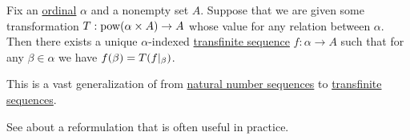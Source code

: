 \begin{theorem}\label{thm:bounded_transfinite_recursion}
  Fix an \hyperref[def:ordinal]{ordinal} \( \alpha \) and a nonempty set \( A \). Suppose that we are given some transformation \( T: \operatorname{pow}(\alpha \times A) \to A \) whose value for any relation between \( \alpha \). Then there exists a unique \( \alpha \)-indexed \hyperref[def:transfinite_sequence]{transfinite sequence} \( f: \alpha \to A \) such that for any \( \beta \in \alpha \) we have \( f(\beta) = T(f\vert_\beta) \).

  This is a vast generalization of  from \hyperref[def:sequence]{natural number sequences} to \hyperref[def:transfinite_sequence]{transfinite sequences}.

  See  about a reformulation that is often useful in practice.
\end{theorem}

